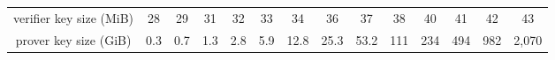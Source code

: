 \begin{table}[H]
{\begin{tabular}{cccccccccccccc}
verifier key size (MiB)                    & 28                                 & 29                                 & 31                                 & 32                                 & 33                                & 34                                & 36                                & 37                                 & 38                                 & 40                                 & 41                                 & 42                                  & 43                                   \\
prover key size (GiB)                      & 0.3                                & 0.7                                & 1.3                                & 2.8                                & 5.9                               & 12.8                              & 25.3                              & 53.2                               & 111                                & 234                                & 494                                & 982                                 & 2,070                                \\ \hline
\end{tabular}
}
\end{table}


